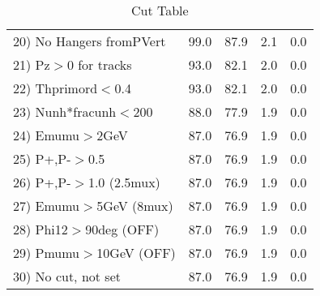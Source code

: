 \begin{table}[h!]
\begin{tabular}{||l||r|r|r|r||}
 20) No Hangers fromPVert &        99.0 &        87.9 &         2.1 &         0.0 \\
 21) Pz$>$0 for tracks    &        93.0 &        82.1 &         2.0 &         0.0 \\
 22) Thprimord$<$0.4      &        93.0 &        82.1 &         2.0 &         0.0 \\
 23) Nunh*fracunh$<$200   &        88.0 &        77.9 &         1.9 &         0.0 \\
 24) Emumu$>$2GeV         &        87.0 &        76.9 &         1.9 &         0.0 \\
 25) P+,P-$>$0.5          &        87.0 &        76.9 &         1.9 &         0.0 \\
 26) P+,P-$>$1.0 (2.5mux) &        87.0 &        76.9 &         1.9 &         0.0 \\
 27) Emumu$>$5GeV  (8mux) &        87.0 &        76.9 &         1.9 &         0.0 \\
 28) Phi12$>$90deg  (OFF) &        87.0 &        76.9 &         1.9 &         0.0 \\
 29) Pmumu$>$10GeV  (OFF) &        87.0 &        76.9 &         1.9 &         0.0 \\
 30) No cut, not set      &        87.0 &        76.9 &         1.9 &         0.0 \\
 \hline
 \hline
 \end{tabular}
 \caption{Cut Table \cohpip }
 \label{tab-cut_copip}
 \end{table}
